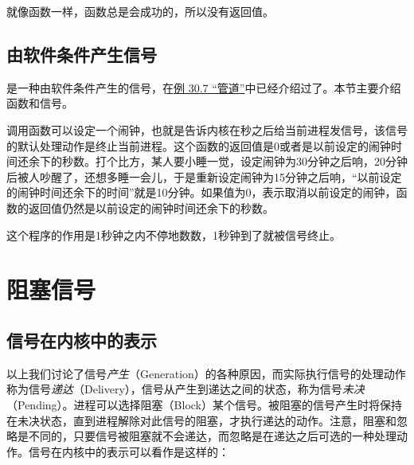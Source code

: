 就像函数一样，函数总是会成功的，所以没有返回值。


\subsection{由软件条件产生信号}
%


是一种由软件条件产生的信号，在\hyperlink{db.ch30s04.id2867940}{例 30.\BookSplit{}7 “管道”}中已经介绍过了。本节主要介绍函数和信号。




调用函数可以设定一个闹钟，也就是告诉内核在秒之后给当前进程发信号，该信号的默认处理动作是终止当前进程。这个函数的返回值是0或者是以前设定的闹钟时间还余下的秒数。打个比方，某人要小睡一觉，设定闹钟为30分钟之后响，20分钟后被人吵醒了，还想多睡一会儿，于是重新设定闹钟为15分钟之后响，“以前设定的闹钟时间还余下的时间”就是10分钟。如果值为0，表示取消以前设定的闹钟，函数的返回值仍然是以前设定的闹钟时间还余下的秒数。





这个程序的作用是1秒钟之内不停地数数，1秒钟到了就被信号终止。




\section{阻塞信号}
%
\subsection{信号在内核中的表示}
%


以上我们讨论了信号\emph{产生}（Generation）的各种原因，而实际执行信号的处理动作称为信号\emph{递达}（Delivery），信号从产生到递达之间的状态，称为信号\emph{未决}（Pending）。进程可以选择阻塞（Block）某个信号。被阻塞的信号产生时将保持在未决状态，直到进程解除对此信号的阻塞，才执行递达的动作。注意，阻塞和忽略是不同的，只要信号被阻塞就不会递达，而忽略是在递达之后可选的一种处理动作。信号在内核中的表示可以看作是这样的：


